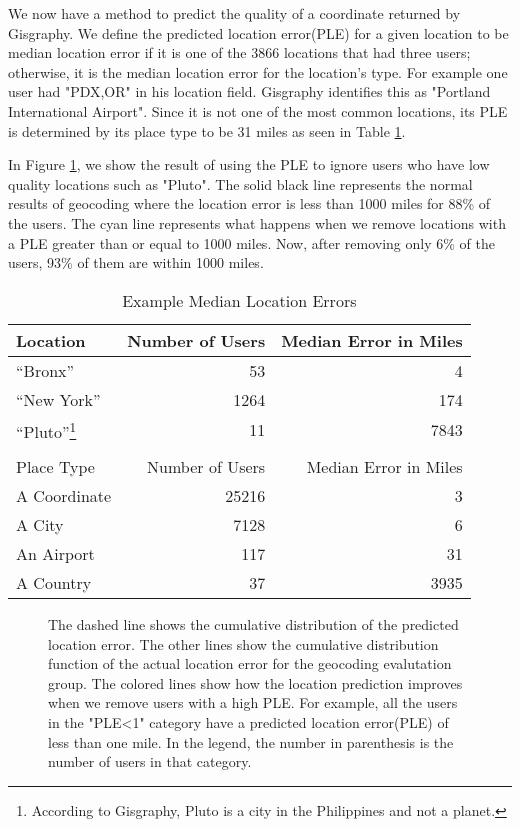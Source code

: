 \documentclass{sig-alternate}
\begin{document}
We now have a method to predict the quality of a coordinate returned by Gisgraphy.
We define the predicted location error(PLE) for a given location to be median location error if it is one of the 3866 locations that had three users; otherwise, it is the median location error for the location's type.
For example one user had "PDX,OR" in his location field. Gisgraphy identifies this as "Portland International Airport". Since it is not one of the most common locations, its PLE is determined by its place type to be 31 miles as seen in Table \ref{tab:MedianLocErr}.

In Figure \ref{fig:DiffGnpGps}, we show the result of using the PLE to ignore users who have low quality locations such as "Pluto".
The solid black line represents the normal results of geocoding where the location error is less than 1000 miles for 88\% of the users.
The cyan line represents what happens when we remove locations with a PLE greater than or equal to 1000 miles. Now, after removing only 6\% of the users, 93\% of them are within 1000 miles.

\begin{table}
\centering
\caption{Example Median Location Errors}
\begin{tabular}{l r r} 
Location&Number of Users&Median Error in Miles\\ \hline
``Bronx''&53&4\\
``New York''&1264&174\\
``Pluto''\footnote{According to Gisgraphy, Pluto is a city in the Philippines and not a planet.}&11&7843\\ \hline
\\
Place Type&Number of Users&Median Error in Miles\\ \hline
A Coordinate&25216&3\\
A City&7128&6\\
An Airport&117&31\\
A Country&37&3935\\
\hline\end{tabular}
\label{tab:MedianLocErr}
\end{table}

\begin{figure}
\centering
{}
\caption{
The dashed line shows the cumulative distribution of the predicted location error.
The other lines show the  cumulative distribution function of the actual location error for the geocoding evalutation group. The colored lines show how the location prediction improves when we remove users with a high PLE. For example, all the users in the "PLE<1" category have a predicted location error(PLE) of less than one mile.
In the legend, the number in parenthesis is the number of users in that category.
}
\label{fig:DiffGnpGps}
\end{figure}
\end{document}
